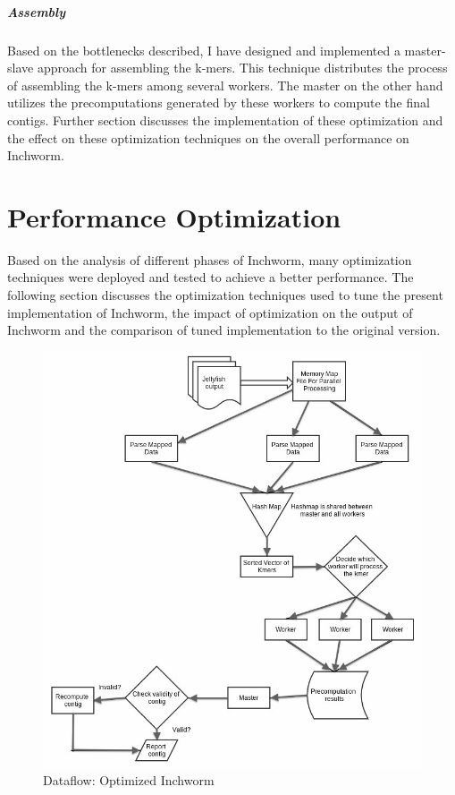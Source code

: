 \label{key}\documentclass[bachinf, english ,zihtitle,final,hyperref,utf8]{zihpub}
\begin{document}
\paragraph{Assembly}
Based on the bottlenecks described, I have designed and implemented a master-slave approach for assembling the k-mers. This technique distributes the process of assembling the k-mers among several workers. The master on the other hand utilizes the precomputations generated by these workers to compute the final contigs. Further section discusses the implementation of these optimization and the effect on these optimization techniques on the overall performance on Inchworm.
\newpage
\chapter{Performance Optimization}
Based on the analysis of different phases of Inchworm, many optimization techniques were deployed and tested to achieve a better performance. The following section discusses the optimization techniques used to tune the present implementation of Inchworm, the impact of optimization on the output of Inchworm and the comparison of tuned implementation to the original version. 
\begin{figure}[h]
\center
\includegraphics[scale=0.45]{Inchworm_dfd}
\caption{Dataflow: Optimized Inchworm}
\label{dfd}
\end{figure}
\end{document}
